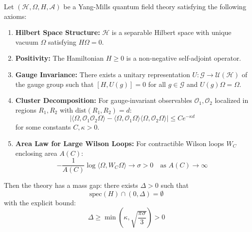 \begin{theorem}
\label{thm:axiomatic-mass-gap}
Let $(\mathcal{H}, \Omega, H, \mathcal{A})$ be a Yang-Mills quantum field theory 
satisfying the following axioms:
\begin{enumerate}[label=\textbf{(A\arabic*)}]
\item \textbf{Hilbert Space Structure:} $\mathcal{H}$ is a separable Hilbert 
space with unique vacuum $\Omega$ satisfying $H\Omega = 0$.
\item \textbf{Positivity:} The Hamiltonian $H \geq 0$ is a non-negative 
self-adjoint operator.
\item \textbf{Gauge Invariance:} There exists a unitary representation 
$U: \mathcal{G} \to \mathcal{U}(\mathcal{H})$ of the gauge group such that 
$[H, U(g)] = 0$ for all $g \in \mathcal{G}$ and $U(g)\Omega = \Omega$.
\item \textbf{Cluster Decomposition:} For gauge-invariant observables 
$\mathcal{O}_1, \mathcal{O}_2$ localized in regions $R_1, R_2$ with 
$\mathrm{dist}(R_1, R_2) = d$:
\[
|\langle \Omega, \mathcal{O}_1 \mathcal{O}_2 \Omega \rangle - 
\langle \Omega, \mathcal{O}_1 \Omega \rangle \langle \Omega, \mathcal{O}_2 \Omega \rangle| 
\leq C e^{-\kappa d}
\]
for some constants $C, \kappa > 0$.
\item \textbf{Area Law for Large Wilson Loops:} For contractible Wilson loops 
$W_C$ enclosing area $A(C)$:
\[
-\frac{1}{A(C)} \log \langle \Omega, W_C \Omega \rangle \to \sigma > 0 
\quad \text{as } A(C) \to \infty
\]
\end{enumerate}
Then the theory has a mass gap: there exists $\Delta > 0$ such that
\[
\mathrm{spec}(H) \cap (0, \Delta) = \emptyset
\]
with the explicit bound:
\begin{equation}
\Delta \geq \min\left(\kappa, \sqrt{\frac{\pi\sigma}{3}}\right) > 0
\end{equation}
\end{theorem}

